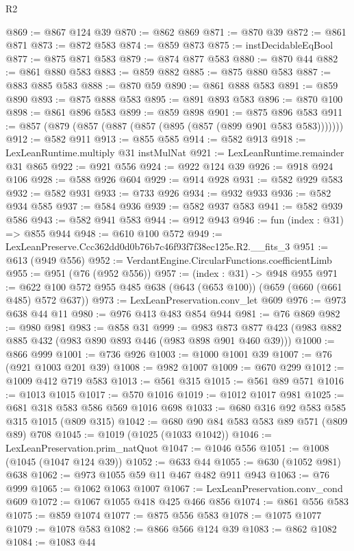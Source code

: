 \begin{lexlean}{R2}
\begin{coremodule}
@869 := @867 @124 @39
@870 := @862 @869
@871 := @870 @39
@872 := @861 @871
@873 := @872 @583
@874 := @859 @873
@875 := instDecidableEqBool
@877 := @875 @871 @583
@879 := @874 @877 @583
@880 := @870 @44
@882 := @861 @880 @583
@883 := @859 @882
@885 := @875 @880 @583
@887 := @883 @885 @583
@888 := @870 @59
@890 := @861 @888 @583
@891 := @859 @890
@893 := @875 @888 @583
@895 := @891 @893 @583
@896 := @870 @100
@898 := @861 @896 @583
@899 := @859 @898
@901 := @875 @896 @583
@911 := @857 (@879 (@857 (@887 (@857 (@895 (@857 (@899 @901 @583 @583)))))))
@912 := @582 @911
@913 := @855 @585
@914 := @582 @913
@918 := LexLeanRuntime.multiply @31 instMulNat
@921 := LexLeanRuntime.remainder @31 @865
@922 := @921 @556
@924 := @922 @124 @39
@926 := @918 @924 @106
@928 := @588 @926 @604
@929 := @914 @928
@931 := @582 @929 @583
@932 := @582 @931
@933 := @733 @926
@934 := @932 @933
@936 := @582 @934 @585
@937 := @584 @936
@939 := @582 @937 @583
@941 := @582 @939 @586
@943 := @582 @941 @583
@944 := @912 @943
@946 := fun (index : @31) => @855 @944
@948 := @610 @100 @572
@949 := LexLeanPreserve.Ccc362dd0d0b76b7c46f93f7f38ec125e.R2.__fits_3
@951 := @613 (@949 @556)
@952 := VerdantEngine.CircularFunctions.coefficientLimb
@955 := @951 (@76 (@952 @556))
@957 := (index : @31) -> @948 @955
@971 := @622 @100 @572 @955 @485 @638 (@643 (@653 @100)) (@659 (@660 (@661 @485) @572 @637))
@973 := LexLeanPreservation.conv_let @609
@976 := @973 @638 @44 @11
@980 := @976 @413 @483 @854 @944
@981 := @76 @869
@982 := @980 @981
@983 := @858 @31
@999 := @983 @873 @877 @423 (@983 @882 @885 @432 (@983 @890 @893 @446 (@983 @898 @901 @460 @39)))
@1000 := @866 @999
@1001 := @736 @926
@1003 := @1000 @1001 @39
@1007 := @76 (@921 @1003 @201 @39)
@1008 := @982 @1007
@1009 := @670 @299
@1012 := @1009 @412 @719 @583
@1013 := @561 @315
@1015 := @561 @89 @571
@1016 := @1013 @1015
@1017 := @570 @1016
@1019 := @1012 @1017 @981
@1025 := @681 @318 @583 @586 @569 @1016 @698
@1033 := @680 @316 @92 @583 @585 @315 @1015 (@809 @315)
@1042 := @680 @90 @84 @583 @583 @89 @571 (@809 @89) @708
@1045 := @1019 (@1025 (@1033 @1042))
@1046 := LexLeanPreservation.prim_natQuot
@1047 := @1046 @556
@1051 := @1008 (@1045 (@1047 @124 @39))
@1052 := @633 @44
@1055 := @630 (@1052 @981) @638
@1062 := @973 @1055 @59 @11 @467 @482 @911 @943
@1063 := @76 @999
@1065 := @1062 @1063 @1007
@1067 := LexLeanPreservation.conv_cond @609
@1072 := @1067 @1055 @418 @425 @466 @856
@1074 := @861 @556 @583
@1075 := @859 @1074
@1077 := @875 @556 @583
@1078 := @1075 @1077
@1079 := @1078 @583
@1082 := @866 @566 @124 @39
@1083 := @862 @1082
@1084 := @1083 @44

\end{coremodule}
\end{lexlean}
